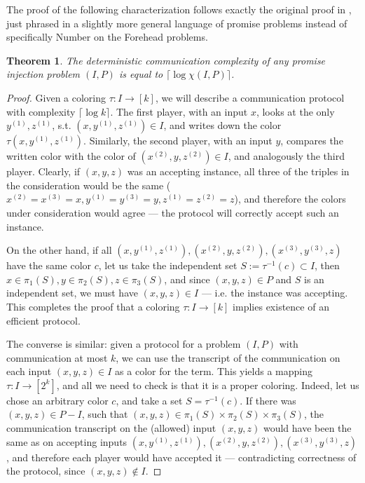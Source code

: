 \documentclass[10pt,a4paper]{article}
\newtheorem{theorem}{Theorem}
\begin{document}
The proof of the following characterization follows exactly the original proof in \cite{CFL83}, just phrased in a slightly more general language of promise problems instead of specifically Number on the Forehead problems.

\begin{theorem}
\label{thm:coloring-is-communication}
The deterministic communication complexity of any promise injection problem $(I, P)$ is equal to $\lceil \log \chi(I,P) \rceil$.
\end{theorem}
\begin{proof}
Given a coloring $\tau : I \to [k]$, we will describe a communication protocol with complexity $\lceil \log k \rceil$. The first player, with an input $x$, looks at the only $y^{(1)},z^{(1)}$, s.t. $(x,y^{(1)},z^{(1)}) \in I$, and writes down the color $\tau(x,y^{(1)},z^{(1)})$. Similarly, the second player, with an input $y$, compares the written color with the color of $(x^{(2)}, y, z^{(2)}) \in I$, and analogously the third player. Clearly, if $(x,y,z)$ was an accepting instance, all three of the triples in the consideration would be the same ($x^{(2)} = x^{(3)} = x, y^{(1)} = y^{(3)} = y, z^{(1)} = z^{(2)} = z$), and therefore the colors under consideration would agree --- the protocol will correctly accept such an instance.

On the other hand, if all $(x, y^{(1)}, z^{(1)}), (x^{(2)}, y, z^{(2)}), (x^{(3)}, y^{(3)}, z)$ have the same color $c$, let us take the independent set $S := \tau^{-1}(c) \subset I$, then $x \in \pi_1(S), y \in \pi_2(S), z \in \pi_3(S)$, and since $(x,y,z) \in P$ and $S$ is an independent set, we  must have $(x,y,z) \in I$ --- i.e. the instance was accepting. This completes the proof that a coloring $\tau : I \to [k]$ implies existence of an efficient protocol.

The converse is similar: given a protocol for a problem $(I, P)$ with communication at most $k$, we can use the transcript of the communication on each input $(x,y,z) \in I$ as a color for the term. This yields a mapping $\tau : I \to [2^k]$, and all we need to check is that it is a proper coloring. Indeed, let us chose an arbitrary color $c$, and take a set $S = \tau^{-1}(c)$. If there was $(x, y, z) \in P - I$, such that $(x, y, z) \in \pi_1(S) \times \pi_2(S) \times \pi_3(S)$, the communication transcript on the (allowed) input $(x,y,z)$ would have been the same as on accepting inputs $(x, y^{(1)}, z^{(1)}), (x^{(2)}, y, z^{(2)}), (x^{(3)}, y^{(3)}, z)$, and therefore each player would have accepted it --- contradicting correctness of the protocol, since $(x,y,z) \not\in I$.
\end{proof}
\end{document}
